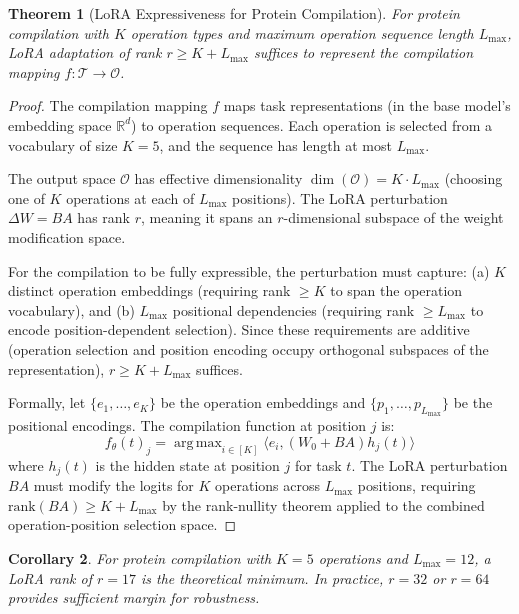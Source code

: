\documentclass[11pt,twocolumn,a4paper]{article}
\newtheorem{theorem}{Theorem}[section]
\newtheorem{corollary}[theorem]{Corollary}
\theoremstyle{definition}
\theoremstyle{remark}
\DeclareMathOperator*{\argmax}{arg\,max}
\newcommand{\R}{\mathbb{R}}
\newcommand{\params}{\theta}
\newcommand{\taskspace}{\mathcal{T}}
\newcommand{\opspace}{\mathcal{O}}
\begin{document}
\begin{theorem}[LoRA Expressiveness for Protein Compilation]
\label{thm:lora_expressiveness}
For protein compilation with $K$ operation types and maximum operation sequence length $L_{\max}$, LoRA adaptation of rank $r \geq K + L_{\max}$ suffices to represent the compilation mapping $f: \taskspace \to \opspace$.
\end{theorem}

\begin{proof}
The compilation mapping $f$ maps task representations (in the base model's embedding space $\R^d$) to operation sequences. Each operation is selected from a vocabulary of size $K = 5$, and the sequence has length at most $L_{\max}$.

The output space $\opspace$ has effective dimensionality $\dim(\opspace) = K \cdot L_{\max}$ (choosing one of $K$ operations at each of $L_{\max}$ positions). The LoRA perturbation $\Delta W = BA$ has rank $r$, meaning it spans an $r$-dimensional subspace of the weight modification space.

For the compilation to be fully expressible, the perturbation must capture: (a) $K$ distinct operation embeddings (requiring rank $\geq K$ to span the operation vocabulary), and (b) $L_{\max}$ positional dependencies (requiring rank $\geq L_{\max}$ to encode position-dependent selection). Since these requirements are additive (operation selection and position encoding occupy orthogonal subspaces of the representation), $r \geq K + L_{\max}$ suffices.

Formally, let $\{e_1, \ldots, e_K\}$ be the operation embeddings and $\{p_1, \ldots, p_{L_{\max}}\}$ be the positional encodings. The compilation function at position $j$ is:
\begin{equation}
f_\params(t)_j = \argmax_{i \in [K]} \langle e_i, (W_0 + BA) h_j(t) \rangle
\end{equation}
where $h_j(t)$ is the hidden state at position $j$ for task $t$. The LoRA perturbation $BA$ must modify the logits for $K$ operations across $L_{\max}$ positions, requiring $\text{rank}(BA) \geq K + L_{\max}$ by the rank-nullity theorem applied to the combined operation-position selection space.
\end{proof}

\begin{corollary}
For protein compilation with $K = 5$ operations and $L_{\max} = 12$, a LoRA rank of $r = 17$ is the theoretical minimum. In practice, $r = 32$ or $r = 64$ provides sufficient margin for robustness.
\end{corollary}
\end{document}
